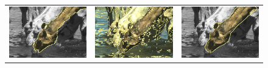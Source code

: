 \documentclass[smallextended]{svjour3}       %
\begin{document}
{{\begin{figure}[hp!]
\begin{tabular}{ccc}
		\includegraphics[scale=0.2]{segmentation_bc_camel_gc-seg.png} &
		\includegraphics[scale=0.2]{segmentation_schoenemann_camel_camel-seg.png} &
		\includegraphics[scale=0.2]{segmentation_bc_camel_corrected-seg.png}\\	

\end{tabular}
\end{figure}}}
\end{document}

